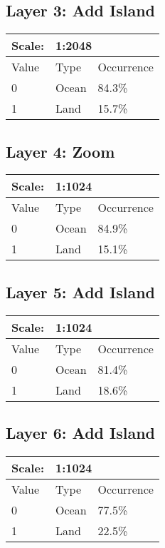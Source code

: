 \documentclass{article}
\begin{document}
	\subsection{Layer 3: Add Island}
	\begin{tabular}{|l|l|l|}\hline
		Scale: & \multicolumn{2}{|l|}{1:2048} \\\hline\hline
		Value  & Type   & Occurrence \\\hline
		0      & Ocean  & 84.3\%\\\hline
		1      & Land   & 15.7\%\\\hline
	\end{tabular}

	\subsection{Layer 4: Zoom}
	\begin{tabular}{|l|l|l|}\hline
		Scale: & \multicolumn{2}{|l|}{1:1024} \\\hline\hline
		Value  & Type   & Occurrence \\\hline
		0      & Ocean  & 84.9\%\\\hline
		1      & Land   & 15.1\%\\\hline
	\end{tabular}
	
	\subsection{Layer 5: Add Island}
	\begin{tabular}{|l|l|l|}\hline
		Scale: & \multicolumn{2}{|l|}{1:1024} \\\hline\hline
		Value  & Type   & Occurrence \\\hline
		0      & Ocean  & 81.4\%\\\hline
		1      & Land   & 18.6\%\\\hline
	\end{tabular}
	
	\subsection{Layer 6: Add Island}
	\begin{tabular}{|l|l|l|}\hline
		Scale: & \multicolumn{2}{|l|}{1:1024} \\\hline\hline
		Value  & Type   & Occurrence \\\hline
		0      & Ocean  & 77.5\%\\\hline
		1      & Land   & 22.5\%\\\hline
	\end{tabular}
	
\end{document}
